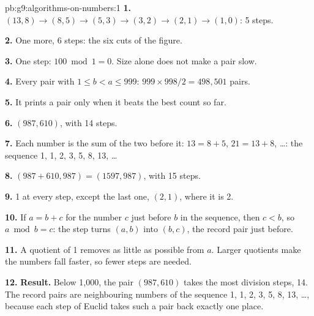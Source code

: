 \begin{solution}{pb:g9:algorithms-on-numbers:1}
\textbf{1.} $(13, 8) \to (8, 5) \to (5, 3) \to (3, 2) \to (2, 1) \to (1, 0)$:
5 steps.

\textbf{2.} One more, 6 steps: the six cuts of the figure.

\textbf{3.} One step: $100 \bmod 1 = 0$. Size alone does not make a pair slow.

\textbf{4.} Every pair with $1 \le b < a \le 999$: $999 \times 998 / 2 =
498{,}501$ pairs.

\textbf{5.} It prints a pair only when it beats the best count so far.

\label{out:g9:algorithms-on-numbers:slowest}

\textbf{6.} $(987, 610)$, with 14 steps.

\textbf{7.} Each number is the sum of the two before it: $13 = 8 + 5$,
$21 = 13 + 8$, \ldots: the sequence 1, 1, 2, 3, 5, 8, 13, \ldots

\textbf{8.} $(987 + 610, 987) = (1597, 987)$, with 15 steps.

\textbf{9.} 1 at every step, except the last one, $(2, 1)$, where it is 2.

\textbf{10.} If $a = b + c$ for the number $c$ just before $b$ in the sequence,
then $c < b$, so $a \bmod b = c$: the step turns $(a, b)$ into $(b, c)$, the
record pair just before.

\textbf{11.} A quotient of 1 removes as little as possible from $a$. Larger
quotients make the numbers fall faster, so fewer steps are needed.

\textbf{12.} \textbf{Result.} Below 1,000, the pair $(987, 610)$ takes the most
division steps, 14. The record pairs are neighbouring numbers of the sequence
1, 1, 2, 3, 5, 8, 13, \ldots, because each step of Euclid takes such a pair
back exactly one place.
\end{solution}

